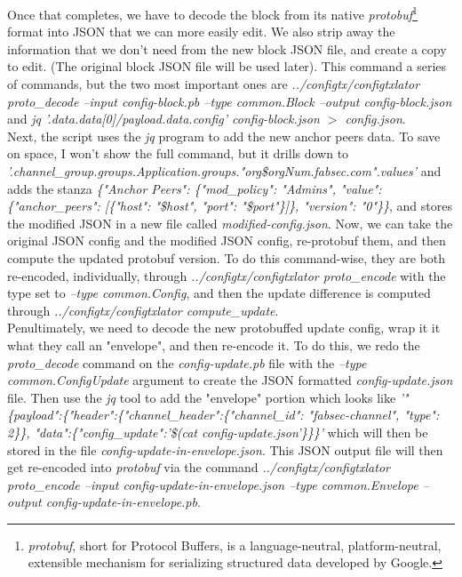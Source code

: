 \begin{itemize}
					\hspace{10mm}Once that completes, we have to decode the block from its native \textit{protobuf}\footnote{\textit{protobuf}, short for Protocol Buffers, is a language-neutral, platform-neutral, extensible mechanism for serializing structured data developed by Google.} format into JSON that we can more easily edit. We also strip away the information that we don't need from the new block JSON file, and create a copy to edit. (The original block JSON file will be used later). This command a series of commands, but the two most important ones are \textit{../configtx/configtxlator proto\_decode --input config-block.pb --type common.Block --output config-block.json} and \textit{jq '.data.data[0]/payload.data.config' config-block.json $>$ config.json}.\\
					
					\hspace{10mm}Next, the script uses the \textit{jq} program to add the new anchor peers data. To save on space, I won't show the full command, but it drills down to \textit{'.channel\_group.groups.Application.groups."org\$orgNum.fabsec.com".values'} and adds the stanza \textit{\{"Anchor Peers": \{"mod\_policy": "Admins", "value":\{"anchor\_peers": [\{"host": "\$host", "port": "\$port"\}]\}, "version": "0"\}\}}, and stores the modified JSON in a new file called \textit{modified-config.json}. Now, we can take the original JSON config and the modified JSON config, re-protobuf them, and then compute the updated protobuf version. To do this command-wise, they are both re-encoded, individually, through \textit{../configtx/configtxlator proto\_encode} with the type set to \textit{--type common.Config}, and then the update difference is computed through \textit{../configtx/configtxlator compute\_update}.\\
					
					\hspace{10mm}Penultimately, we need to decode the new protobuffed update config, wrap it it what they call an "envelope", and then re-encode it. To do this, we redo the \textit{proto\_decode} command on the \textit{config-update.pb} file with the \textit{--type common.ConfigUpdate} argument to create the JSON formatted \textit{config-update.json} file. Then use the \textit{jq} tool to add the "envelope" portion which looks like \textit{'"\{payload":\{"header":\{"channel\_header":\{"channel\_id": "fabsec-channel", "type": 2\}\}, "data":\{"config\_update":'\$(cat config-update.json'\}\}\}'} which will then be stored in the file \textit{config-update-in-envelope.json}. This JSON output file will then get re-encoded into \textit{protobuf} via the command \textit{../configtx/configtxlator proto\_encode --input config-update-in-envelope.json --type common.Envelope --output config-update-in-envelope.pb}.\\
					

\end{itemize}
